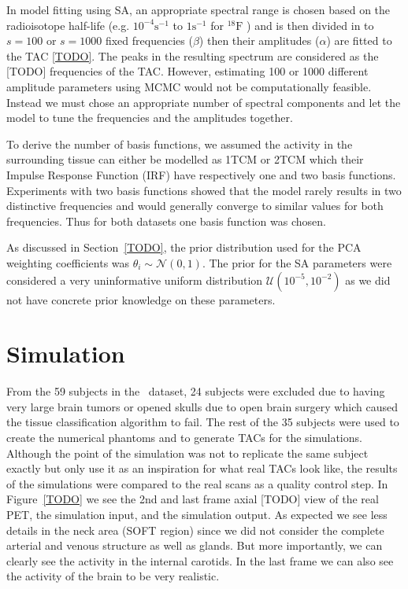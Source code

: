 In model fitting using SA, an appropriate spectral range is chosen based on the radioisotope half-life (e.g. $10^{-4} \mathrm{s}^{-1}$ to $1 \mathrm{s}^{-1}$ for $^{18}\mathrm{F}$ ) and is then divided in to $s=100$ or $s=1000$ fixed frequencies ($\beta$) then their amplitudes ($\alpha$) are fitted to the TAC \ref{TODO}.
The peaks in the resulting spectrum are considered as the [TODO] frequencies of the TAC.
However, estimating 100 or 1000 different amplitude parameters using MCMC would not be computationally feasible.
Instead we must chose an appropriate number of spectral components and let the model to tune the frequencies and the amplitudes together.

To derive the number of basis functions, we assumed the activity in the surrounding tissue can either be modelled as 1TCM or 2TCM which their Impulse Response Function (IRF) have respectively one and two basis functions.
Experiments with two basis functions showed that the model rarely results in two distinctive frequencies and would generally converge to similar values for both frequencies.
Thus for both datasets one basis function was chosen.

As discussed in Section~\ref{TODO}, the prior distribution used for the PCA weighting coefficients was $\theta_i \sim \mathcal{N}(0,1)$.
The prior for the SA parameters were considered a very uninformative uniform distribution $\mathcal{U}(10^{-5},10^{-2})$ as we did not have concrete prior knowledge on these parameters.


\section{Simulation}
From the 59 subjects in the \fdg $\,$ dataset, 24 subjects were excluded due to having very large brain tumors or opened skulls due to open brain surgery which caused the tissue classification algorithm to fail.
The rest of the 35 subjects were used to create the numerical phantoms and to generate TACs for the simulations.
Although the point of the simulation was not to replicate the same subject exactly but only use it as an inspiration for what real TACs look like, the results of the simulations were compared to the real scans as a quality control step.
In Figure~\ref{TODO} we see the 2nd and last frame axial [TODO] view of the real PET, the simulation input, and the simulation output.
As expected we see less details in the neck area (SOFT region) since we did not consider the complete arterial and venous structure as well as glands. But more importantly, we can clearly see the activity in the internal carotids.
In the last frame we can also see the activity of the brain to be very realistic.

